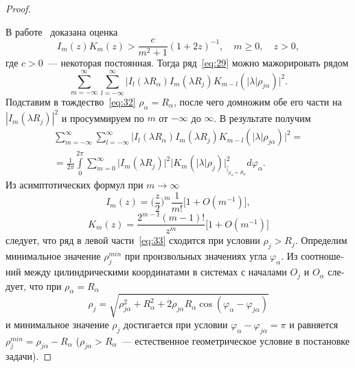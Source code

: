 \begin{russian}
\begin{proof}
\begin{equation}
\label{eq:31}
\end{equation}
\par В работе~\cite{Nikolaev1998} доказана оценка
\begin{equation}
I_m(z)K_m(z)>\frac{c}{m^2+1}(1+2z)^{-1},\quad m\ge 0,\quad z>0,
\label{eq:37}
\end{equation}
где $c>0$~--- некоторая постоянная. Тогда ряд~\eqref{eq:29} можно мажорировать рядом
\begin{equation*}
\sum\limits_{m=-\infty}^\infty\sum\limits_{l=-\infty}^\infty\bigg|I_l(\lambda R_\alpha)I_m(\lambda R_j)K_{m-l}(|\lambda|\rho_{j\alpha})\bigg|^2.
\end{equation*}
Подставим в тождество~\eqref{eq:32} $\rho_\alpha=R_\alpha$, после чего домножим обе его части на $|I_m(\lambda R_j)|^2$ и просуммируем по $m$ от $-\infty$ до $\infty$. В результате получим
\begin{multline}
\sum\limits_{m=-\infty}^\infty\sum\limits_{l=-\infty}^\infty\bigg|I_l(\lambda R_\alpha)I_m(\lambda R_j)K_{m-l}(|\lambda|\rho_{j\alpha})\bigg|^2=\\
=\frac{1}{2\pi}\int\limits_0^{2\pi}\sum\limits_{m=0}^\infty\bigg|I_m(\lambda R_j)\bigg|^2\bigg|K_m(|\lambda|\rho_j)\bigg|_{|_{\rho_\alpha=R_\alpha}}^2d\varphi_\alpha.
\label{eq:33}
\end{multline}
Из асимптотических формул при $m\rightarrow\infty$~\cite{Lebedev}
\begin{equation}
I_m(z)=\bigg(\frac{z}{2}\bigg)^m\frac{1}{m!}\bigg[1+O(m^{-1})\bigg],
\label{eq:35}
\end{equation}
\begin{equation}
K_m(z)=\frac{2^{m-1}(m-1)!}{z^m}\bigg[1+O(m^{-1})\bigg]
\label{eq:36}
\end{equation}
следует, что ряд в левой части~\eqref{eq:33} сходится при условии $\rho_j>R_j$. Определим минимальное значение $\rho_j^{min}$ при произвольных значениях угла $\varphi_\alpha$. Из соотношений между цилиндрическими координатами в системах с началами $O_j$ и $O_\alpha$ следует, что при $\rho_\alpha=R_\alpha$
\begin{equation*}
\rho_j=\sqrt{\rho_{j\alpha}^2+R_\alpha^2+2\rho_{j\alpha}R_\alpha\cos{(\varphi_\alpha-\varphi_{j\alpha})}}
\end{equation*}
и минимальное значение $\rho_j$ достигается при условии $\varphi_\alpha-\varphi_{j\alpha}=\pi$ и равняется $\rho_j^{min}=\rho_{j\alpha}-R_\alpha$ ($\rho_{j\alpha}>R_\alpha$~--- естественное геометрическое условие в постановке задачи).


\end{proof}
\end{russian}
